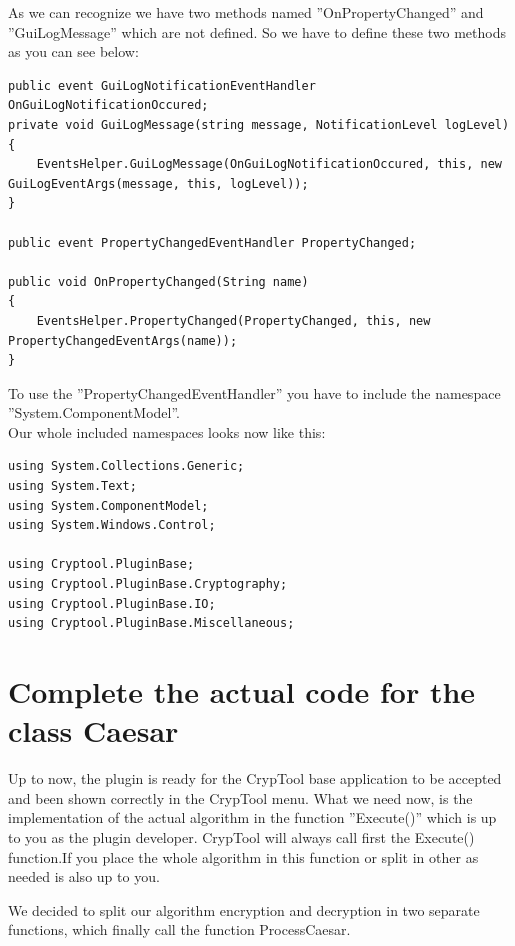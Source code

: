 As we can recognize we have two methods named ''OnPropertyChanged'' and ''GuiLogMessage'' which are not defined. So we have to define these two methods as you can see below:
\begin{lstlisting}
public event GuiLogNotificationEventHandler OnGuiLogNotificationOccured;
private void GuiLogMessage(string message, NotificationLevel logLevel)
{
	EventsHelper.GuiLogMessage(OnGuiLogNotificationOccured, this, new GuiLogEventArgs(message, this, logLevel));
}

public event PropertyChangedEventHandler PropertyChanged;

public void OnPropertyChanged(String name)
{
	EventsHelper.PropertyChanged(PropertyChanged, this, new PropertyChangedEventArgs(name));
}
\end{lstlisting}
To use the ''PropertyChangedEventHandler'' you have to include the namespace ''System.ComponentModel''.\\
Our whole included namespaces looks now like this:
\begin{lstlisting}
using System.Collections.Generic;
using System.Text;
using System.ComponentModel;
using System.Windows.Control;

using Cryptool.PluginBase;
using Cryptool.PluginBase.Cryptography;
using Cryptool.PluginBase.IO;
using Cryptool.PluginBase.Miscellaneous;
\end{lstlisting}
\section{Complete the actual code for the class Caesar}\label{sec:CompleteTheActualCodeForTheClassCaesar}
Up to now, the plugin is ready for the CrypTool base application to be accepted and been shown correctly in the CrypTool menu. What we need now, is the implementation of the actual algorithm in the function ''Execute()'' which is up to you as the plugin developer. CrypTool will always call first the Execute() function.If you place the whole algorithm in this function or split in other as needed is also up to you.

We decided to split our algorithm encryption and decryption in two separate functions, which finally call the function ProcessCaesar.


